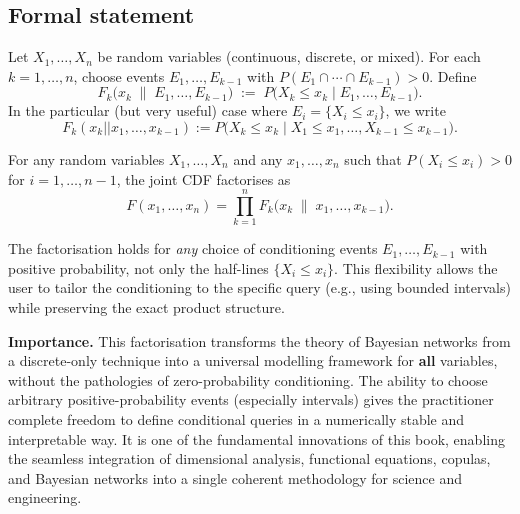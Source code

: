 \subsection{Formal statement}

\begin{definition}
Let $X_1,\dots,X_n$ be random variables (continuous, discrete, or mixed). For each $k = 1,\dots,n$, choose events $E_1,\dots,E_{k-1}$ with $P(E_1\cap\cdots\cap E_{k-1}) > 0$. Define
\[
F_k\bigl(x_k \;\big\|\; E_1,\dots,E_{k-1}\bigr) \;:=\; P\bigl(X_k \le x_k \;\big|\; E_1,\dots,E_{k-1}\bigr).
\]
In the particular (but very useful) case where $E_i = \{X_i \le x_i\}$, we write
\[
F_k(x_k || x_1,\dots,x_{k-1}) := P\bigl(X_k \le x_k \mid X_1 \le x_1,\dots,X_{k-1} \le x_{k-1}\bigr).
\]
\end{definition}

\begin{theorem}
For any random variables $X_1,\dots,X_n$ and any $x_1,\dots,x_n$ such that $P(X_i \le x_i) > 0$ for $i=1,\dots,n-1$, the joint CDF factorises as
\[
F(x_1,\dots,x_n) = \prod_{k=1}^{n} F_k\bigl(x_k \;\big\|\; x_1,\dots,x_{k-1}\bigr).
\]
\end{theorem}

\begin{remarkbox}
\begin{remarkT}
The factorisation holds for \emph{any} choice of conditioning events $E_1,\dots,E_{k-1}$ with positive probability, not only the half-lines $\{X_i \le x_i\}$. This flexibility allows the user to tailor the conditioning to the specific query (e.g., using bounded intervals) while preserving the exact product structure.
\end{remarkT}
\end{remarkbox}

\textbf{Importance.}
This factorisation transforms the theory of Bayesian networks from a discrete-only technique into a universal modelling framework for \textbf{all} variables, without the pathologies of zero-probability conditioning. The ability to choose arbitrary positive-probability events (especially intervals) gives the practitioner complete freedom to define conditional queries in a numerically stable and interpretable way. It is one of the fundamental innovations of this book, enabling the seamless integration of dimensional analysis, functional equations, copulas, and Bayesian networks into a single coherent methodology for science and engineering.


